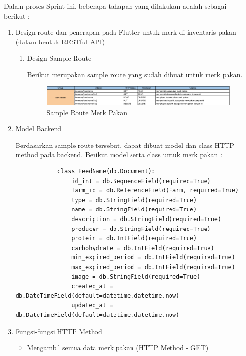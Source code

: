 \begin{spacing}{1.5}
	Dalam proses Sprint ini, beberapa tahapan yang dilakukan adalah sebagai berikut :

	\begin{enumerate}
		\item Design route dan penerapan pada Flutter untuk merk di inventaris pakan (dalam bentuk RESTful API)
		
		\begin{enumerate}
			\item Design Sample Route
			
			Berikut merupakan sample route yang sudah dibuat untuk merk pakan.
			
			\begin{figure}[H]
				\centering
				\includegraphics[width=1\textwidth]{gambar/sprint5/merk_route.png}
				\caption{Sample Route Merk Pakan}
			\end{figure}

		\end{enumerate}

		\item Model Backend
		
		Berdasarkan sample route tersebut, dapat dibuat model dan class HTTP method pada backend. Berikut model serta class untuk merk pakan :

		\begin{lstlisting}
			class FeedName(db.Document):
				id_int = db.SequenceField(required=True)
				farm_id = db.ReferenceField(Farm, required=True)
				type = db.StringField(required=True)
				name = db.StringField(required=True)
				description = db.StringField(required=True)
				producer = db.StringField(required=True)
				protein = db.IntField(required=True)
				carbohydrate = db.IntField(required=True)
				min_expired_period = db.IntField(required=True)
				max_expired_period = db.IntField(required=True)
				image = db.StringField(required=True)
				created_at = db.DateTimeField(default=datetime.datetime.now)
				updated_at = db.DateTimeField(default=datetime.datetime.now)
		\end{lstlisting}

		\item Fungsi-fungsi HTTP Method
		
			\begin{itemize}
				\item Mengambil semua data merk pakan (HTTP Method - GET)
					

\end{itemize}
\end{enumerate}
\end{spacing}
